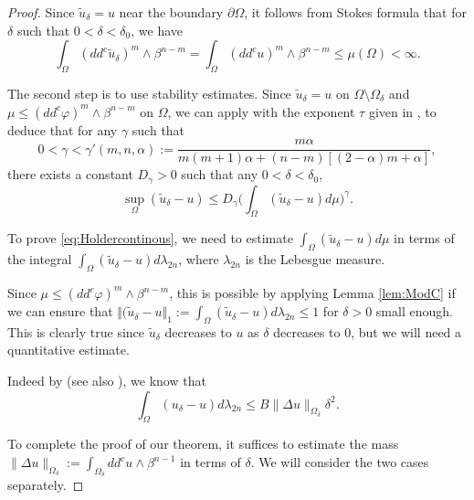 \documentclass[JEP,XML,SOM,Unicode]{cedram}
\theoremstyle{definition}
\begin{document}
\begin{proof}
Since $\tilde u_\delta = u$ near the boundary $\partial \Omega$, it follows from Stokes formula that for $\delta$ such that $0 < \delta < \delta_0$, we have
\[
\int_{\Omega}(dd^c\tilde{u}_{\delta})^m\wedge\beta^{n-m} = \int_{\Omega}(dd^c u)^m\wedge\beta^{n-m} \leq \mu (\Omega) < \infty.
\]

The second step is to use stability estimates. Since $\tilde u_\delta = u$ on $\Omega \setminus \Omega_\delta$ and $\mu\leq (dd^c\varphi)^m\wedge\beta^{n-m}$ on $\Omega$, we can apply \cite[Prop.\,2.20]{BZ20} with the exponent $\tau$ given in \cite[Th.\,A]{BZ20}, to deduce that for any $\gamma$ such that
\[
0 <\gamma < \gamma' (m,n,\alpha):=
\frac{m \alpha}{ m (m + 1) \alpha + (n-m) [(2 - \alpha)m + \alpha]},
\]
there exists a constant $D_\gamma > 0$ such that any $0 < \delta < \delta_0$,
\begin{equation} \label{eq2}
\sup_{\Omega}(\tilde{u}_{\delta}-u) \leq D_{\gamma} \biggl(\int_{\Omega}(\tilde{u}_{\delta}-u) d\mu\biggr)^{\gamma}.
\end{equation}

To prove \eqref{eq:Holdercontinous}, we need to estimate $\int_{\Omega}(\tilde{u}_{\delta}-u) d\mu$ in terms of the integral \hbox{$\int_{\Omega}(\tilde{u}_{\delta}-u) d\lambda_{2n}$}, where $\lambda_{2n}$ is the Lebesgue measure.

Since $\mu \leq (dd^c \varphi)^m \wedge \beta^{n-m}$, this is possible by applying Lemma \ref{lem:ModC} if we can ensure that $\Vert (\tilde{u}_{\delta}-u \Vert_{1} := \int_{\Omega}(\tilde{u}_{\delta}-u) d\lambda_{2n} \leq 1$ for $\delta > 0$ small enough. This is clearly true since $\tilde{u}_\delta$ decreases to $ u$ as $\delta$ decreases to $0$, but we will need a quantitative estimate.

Indeed by \cite{GKZ08} (see also \cite[Lem.\,2.3]{BZ20}), we know that
\begin{equation} \label{eq3}
\int_{\Omega}({u}_{\delta}-u) d \lambda_{2 n} \leq B \|\Delta u\|_{\Omega_\delta}\delta^2.
\end{equation}

To complete the proof of our theorem, it suffices to estimate the mass $\|\Delta u\|_{\Omega_\delta} := \int_{\Omega_\delta} dd^c u \wedge \beta^{n-1}$ in terms of $\delta$.
We will consider the two cases separately.


\end{proof}
\end{document}

